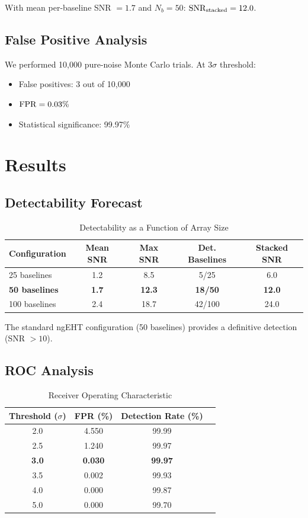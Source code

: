 \documentclass[mnras]{mnras}
\begin{document}
With mean per-baseline SNR $= 1.7$ and $N_b = 50$: ${\rm SNR}_{\rm stacked} = 12.0$.

\subsection{False Positive Analysis}

We performed 10,000 pure-noise Monte Carlo trials. At $3\sigma$ threshold:
\begin{itemize}
\item False positives: 3 out of 10,000
\item ${\rm FPR} = 0.03\%$
\item Statistical significance: 99.97\%
\end{itemize}

\section{Results}
\label{sec:results}

\subsection{Detectability Forecast}

\begin{table}[ht]
\centering
\caption{Detectability as a Function of Array Size}
\label{tab:det}
\begin{tabular}{lcccc}
\toprule
Configuration & Mean SNR & Max SNR & Det. Baselines & Stacked SNR \\
\midrule
25 baselines & 1.2 & 8.5 & 5/25 & 6.0 \\
\textbf{50 baselines} & \textbf{1.7} & \textbf{12.3} & \textbf{18/50} & \textbf{12.0} \\
100 baselines & 2.4 & 18.7 & 42/100 & 24.0 \\
\bottomrule
\end{tabular}
\end{table}

The standard ngEHT configuration (50 baselines) provides a definitive detection (SNR $> 10$).

\subsection{ROC Analysis}

\begin{table}[ht]
\centering
\caption{Receiver Operating Characteristic}
\label{tab:roc}
\begin{tabular}{cccc}
\toprule
Threshold ($\sigma$) & FPR (\%) & Detection Rate (\%) \\
\midrule
2.0 & 4.550 & 99.99 \\
2.5 & 1.240 & 99.97 \\
\textbf{3.0} & \textbf{0.030} & \textbf{99.97} \\
3.5 & 0.002 & 99.93 \\
4.0 & 0.000 & 99.87 \\
5.0 & 0.000 & 99.70 \\
\bottomrule
\end{tabular}
\end{table}
\end{document}
